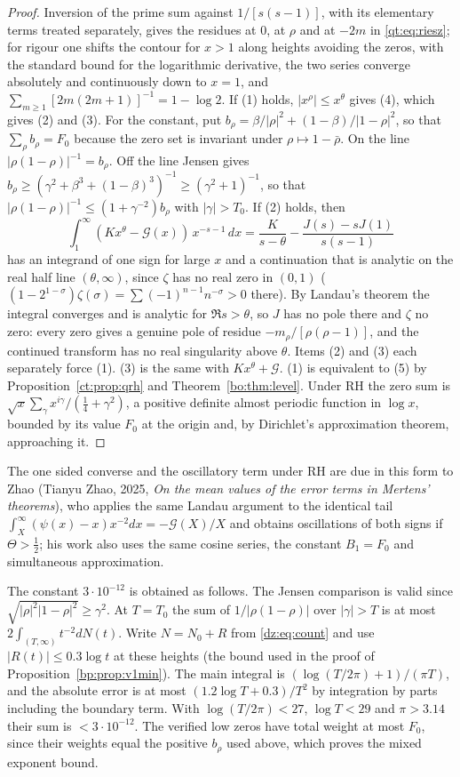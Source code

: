 \begin{proof}
Inversion of the prime sum against $1/[s(s-1)]$, with its elementary terms treated separately, gives the residues at $0$, at $\rho$ and at $-2m$ in \eqref{qt:eq:riesz}; for rigour one shifts the contour for $x>1$ along heights avoiding the zeros, with the standard bound for the logarithmic derivative, the two series converge absolutely and continuously down to $x=1$, and $\sum_{m\ge1}[2m(2m+1)]^{-1}=1-\log2$. If (1) holds, $|x^\rho|\le x^\theta$ gives (4), which gives (2) and (3). For the constant, put $b_\rho=\beta/|\rho|^2+(1-\beta)/|1-\rho|^2$, so that $\sum_\rho b_\rho=F_0$ because the zero set is invariant under $\rho\mapsto1-\bar\rho$. On the line $|\rho(1-\rho)|^{-1}=b_\rho$. Off the line Jensen gives $b_\rho\ge(\gamma^2+\beta^3+(1-\beta)^3)^{-1}\ge(\gamma^2+1)^{-1}$, so that $|\rho(1-\rho)|^{-1}\le(1+\gamma^{-2})b_\rho$ with $|\gamma|>T_0$. If (2) holds, then
\[
\int_1^\infty(Kx^\theta-\mathcal G(x))\,x^{-s-1}\,dx=\frac K{s-\theta}-\frac{J(s)-sJ(1)}{s(s-1)}
\]
has an integrand of one sign for large $x$ and a continuation that is analytic on the real half line $(\theta,\infty)$, since $\zeta$ has no real zero in $(0,1)$ ($(1-2^{1-\sigma})\zeta(\sigma)=\sum(-1)^{n-1}n^{-\sigma}>0$ there). By Landau's theorem the integral converges and is analytic for $\Re s>\theta$, so $J$ has no pole there and $\zeta$ no zero: every zero gives a genuine pole of residue $-m_\rho/[\rho(\rho-1)]$, and the continued transform has no real singularity above $\theta$. Items (2) and (3) each separately force (1). (3) is the same with $Kx^\theta+\mathcal G$. (1) is equivalent to (5) by Proposition~\ref{ct:prop:qrh} and Theorem~\ref{bo:thm:level}. Under RH the zero sum is $\sqrt x\sum_\gamma x^{i\gamma}/(\tfrac14+\gamma^2)$, a positive definite almost periodic function in $\log x$, bounded by its value $F_0$ at the origin and, by Dirichlet's approximation theorem, approaching it.
\end{proof}

The one sided converse and the oscillatory term under RH are due in this form to Zhao (Tianyu Zhao, 2025, \emph{On the mean values of the error terms in Mertens' theorems}), who applies the same Landau argument to the identical tail $\int_X^\infty(\psi(x)-x)x^{-2}dx=-\mathcal G(X)/X$ and obtains oscillations of both signs if $\Theta>\tfrac12$; his work also uses the same cosine series, the constant $B_1=F_0$ and simultaneous approximation.

The constant $3\cdot10^{-12}$ is obtained as follows. The Jensen comparison is valid since $\sqrt{|\rho|^2|1-\rho|^2}\ge\gamma^2$. At $T=T_0$ the sum of $1/|\rho(1-\rho)|$ over $|\gamma|>T$ is at most $2\int_{(T,\infty)}t^{-2}dN(t)$. Write $N=N_0+R$ from \eqref{dz:eq:count} and use $|R(t)|\le0.3\log t$ at these heights (the bound used in the proof of Proposition~\ref{bp:prop:v1min}). The main integral is $(\log(T/2\pi)+1)/(\pi T)$, and the absolute error is at most $(1.2\log T+0.3)/T^2$ by integration by parts including the boundary term. With $\log(T/2\pi)<27$, $\log T<29$ and $\pi>3.14$ their sum is $<3\cdot10^{-12}$. The verified low zeros have total weight at most $F_0$, since their weights equal the positive $b_\rho$ used above, which proves the mixed exponent bound.

